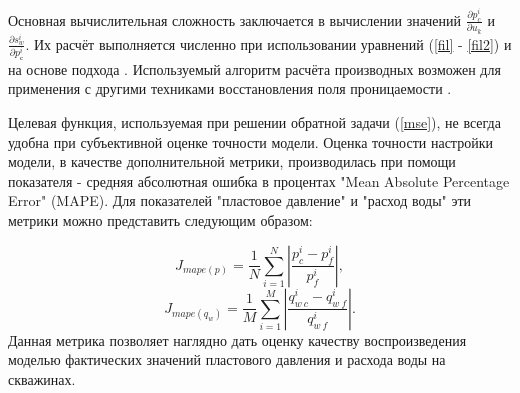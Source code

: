 \documentclass{article}
\begin{document}
Основная вычислительная сложность заключается в вычислении значений $\frac{\partial p_c^i}{\partial u_k}$ и $\frac{\partial s_w^i}{\partial p_с^i}$. Их расчёт выполняется численно при использовании уравнений (\ref{fil} - \ref{fil2}) и на основе подхода \cite{opt}. Используемый алгоритм расчёта производных возможен для применения с другими техниками восстановления поля проницаемости \cite{leg}.

Целевая функция, используемая при решении обратной задачи ({\ref{mse}}), не всегда удобна при субъективной оценке точности модели. Оценка точности настройки модели, в качестве дополнительной метрики, производилась при помощи показателя - средняя абсолютная ошибка в процентах "Mean Absolute Percentage Error" (MAPE). Для показателей "пластовое давление" и  "расход воды" эти метрики можно представить следующим образом:

\begin{equation} \label{mape_p}
 	J_{mape(p)}=\frac{1}{N}\sum_{i=1}^N{\left|\frac{p_c^i-p_f^i}{p_f^i}\right|},
\end{equation}
\begin{equation} \label{mape_qo}
 	J_{mape(q_w)}=\frac{1}{M}\sum_{i=1}^M{\left|\frac{q_{w\:c}^i-q_{w\:f}^i}{q_{w\:f}^i}\right|}.
\end{equation}
Данная метрика позволяет наглядно дать оценку качеству воспроизведения моделью фактических значений пластового давления и расхода воды на скважинах.
\end{document}
